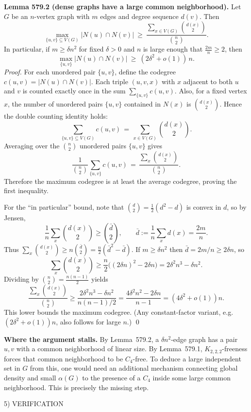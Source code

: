 \medskip
\textbf{Lemma 579.2 (dense graphs have a large common neighborhood).}
Let $G$ be an $n$-vertex graph with $m$ edges and degree sequence $d(v)$. Then
\[
\max_{\{u,v\}\subseteq V(G)} |N(u)\cap N(v)| \ \ge\ \frac{\sum_{x\in V(G)} \binom{d(x)}{2}}{\binom{n}{2}}.
\]
In particular, if $m\ge \delta n^2$ for fixed $\delta>0$ and $n$ is large enough that $\frac{2m}{n}\ge 2$, then
\[
\max_{\{u,v\}} |N(u)\cap N(v)|\ \ge\ (2\delta^2+o(1))\,n.
\]
\emph{Proof.}
For each unordered pair $\{u,v\}$, define the codegree $c(u,v)=|N(u)\cap N(v)|$.
Each triple $(u,v,x)$ with $x$ adjacent to both $u$ and $v$ is counted exactly once in the sum $\sum_{\{u,v\}} c(u,v)$.
Also, for a fixed vertex $x$, the number of unordered pairs $\{u,v\}$ contained in $N(x)$ is $\binom{d(x)}{2}$.
Hence the double counting identity holds:
\[
\sum_{\{u,v\}\subseteq V(G)} c(u,v) \,=\, \sum_{x\in V(G)} \binom{d(x)}{2}.
\]
Averaging over the $\binom{n}{2}$ unordered pairs $\{u,v\}$ gives
\[
\frac{1}{\binom{n}{2}}\sum_{\{u,v\}} c(u,v) \,=\, \frac{\sum_x \binom{d(x)}{2}}{\binom{n}{2}}.
\]
Therefore the maximum codegree is at least the average codegree, proving the first inequality.

For the ``in particular'' bound, note that $\binom{d}{2}=\tfrac12(d^2-d)$ is convex in $d$, so by Jensen,
\[
\frac{1}{n}\sum_x \binom{d(x)}{2} \ge \binom{\bar d}{2},\qquad \bar d:=\frac{1}{n}\sum_x d(x)=\frac{2m}{n}.
\]
Thus $\sum_x \binom{d(x)}{2} \ge n\binom{\bar d}{2}=\frac{n}{2}(\bar d^2-\bar d)$.
If $m\ge \delta n^2$ then $\bar d=2m/n\ge 2\delta n$, so
\[
\sum_x \binom{d(x)}{2} \ge \frac{n}{2}\big((2\delta n)^2-2\delta n\big)=2\delta^2 n^3 - \delta n^2.
\]
Dividing by $\binom{n}{2}=\frac{n(n-1)}{2}$ yields
\[
\frac{\sum_x \binom{d(x)}{2}}{\binom{n}{2}} \ge \frac{2\delta^2 n^3-\delta n^2}{n(n-1)/2}
= \frac{4\delta^2 n^2-2\delta n}{n-1}
= (4\delta^2+o(1))n.
\]
This lower bounds the maximum codegree.
(Any constant-factor variant, e.g. $(2\delta^2+o(1))n$, also follows for large $n$.)
\qed

\medskip
\textbf{Where the argument stalls.}
By Lemma~579.2, a $\delta n^2$-edge graph has a pair $u,v$ with a common neighborhood of linear size.
By Lemma~579.1, $K_{2,2,2}$-freeness forces that common neighborhood to be $C_4$-free.
To deduce a large independent set in $G$ from this, one would need an additional mechanism connecting global density and small $\alpha(G)$ to the presence of a $C_4$ inside some large common neighborhood.
This is precisely the missing step.

5) VERIFICATION

